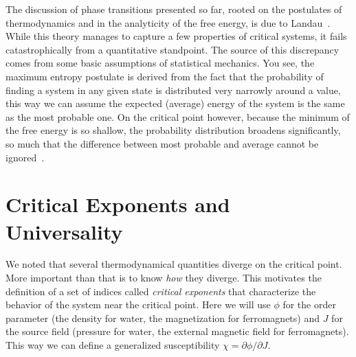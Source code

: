The discussion of phase transitions presented so far, rooted on the postulates
of thermodynamics and in the analyticity of the free energy, is due to
Landau~\cite{Landau1969}. While this theory manages to capture a few properties
of critical systems, it fails catastrophically from a quantitative standpoint.
The source of this discrepancy comes from some basic assumptions of statistical
mechanics. You see, the maximum entropy postulate is derived from the fact that
the probability of finding a system in any given state is distributed very
narrowly around a value, this way we can assume the expected (average) energy
of the system is the same as the most probable one. On the critical point
however, because the minimum of the free energy is so shallow, the probability
distribution broadens significantly, so much that the difference between most
probable and average cannot be ignored~\cite{Callen1985}.


\section{Critical Exponents and Universality}
\label{sec:universality}
\newcommand{\op}{\phi}
\newcommand{\sfi}{J}

We noted that several thermodynamical quantities diverge on the critical point.
More important than that is to know \textit{how} they diverge. This motivates
the definition of a set of indices called \textit{critical exponents} that
characterize the behavior of the system near the critical point. Here we will
use $\op$ for the order parameter (the density for water, the magnetization for
ferromagnets) and $\sfi$ for the source field (pressure for water, the external
magnetic field for ferromagnets). This way we can define a generalized
susceptibility $\chi=\partial\op/\partial \sfi$.

